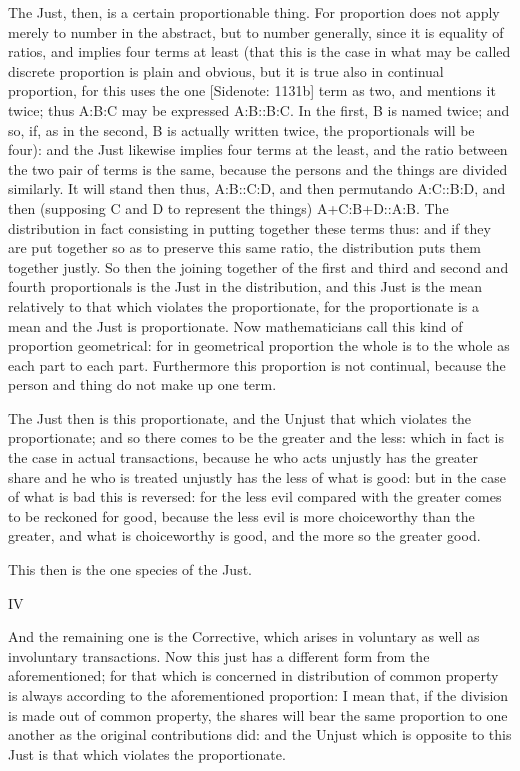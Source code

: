 The Just, then, is a certain proportionable thing. For proportion does
not apply merely to number in the abstract, but to number generally,
since it is equality of ratios, and implies four terms at least (that
this is the case in what may be called discrete proportion is plain and
obvious, but it is true also in continual proportion, for this uses the
one [Sidenote: 1131b] term as two, and mentions it twice; thus A:B:C may
be expressed A:B::B:C. In the first, B is named twice; and so, if, as
in the second, B is actually written twice, the proportionals will be
four): and the Just likewise implies four terms at the least, and the
ratio between the two pair of terms is the same, because the persons and
the things are divided similarly. It will stand then thus, A:B::C:D, and
then permutando A:C::B:D, and then (supposing C and D to represent the
things) A+C:B+D::A:B. The distribution in fact consisting in putting
together these terms thus: and if they are put together so as to
preserve this same ratio, the distribution puts them together justly. So
then the joining together of the first and third and second and fourth
proportionals is the Just in the distribution, and this Just is the
mean relatively to that which violates the proportionate, for
the proportionate is a mean and the Just is proportionate. Now
mathematicians call this kind of proportion geometrical: for in
geometrical proportion the whole is to the whole as each part to each
part. Furthermore this proportion is not continual, because the person
and thing do not make up one term.

The Just then is this proportionate, and the Unjust that which violates
the proportionate; and so there comes to be the greater and the less:
which in fact is the case in actual transactions, because he who acts
unjustly has the greater share and he who is treated unjustly has the
less of what is good: but in the case of what is bad this is reversed:
for the less evil compared with the greater comes to be reckoned for
good, because the less evil is more choiceworthy than the greater, and
what is choiceworthy is good, and the more so the greater good.

This then is the one species of the Just.

IV

And the remaining one is the Corrective, which arises in voluntary as
well as involuntary transactions. Now this just has a different form
from the aforementioned; for that which is concerned in distribution of
common property is always according to the aforementioned proportion: I
mean that, if the division is made out of common property, the
shares will bear the same proportion to one another as the original
contributions did: and the Unjust which is opposite to this Just is that
which violates the proportionate.

